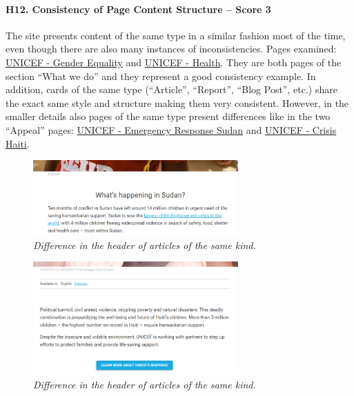 \newpage

\paragraph*{H12. Consistency of Page Content Structure – Score 3}
The site presents content of the same type in a similar fashion most of the time, even though there are also many instances of inconsistencies.
Pages examined: \href{https://www.unicef.org/gender-equality}{UNICEF - Gender Equality} and \href{https://www.unicef.org/health}{UNICEF - Health}. They are both pages of the section “What we do” and they represent a good consistency example. In addition, cards of the same type (“Article”, “Report”, “Blog Post”, etc.) share the exact same style and structure making them very consistent.
However, in the smaller details also pages of the same type present differences like in the two “Appeal” pages: \href{https://www.unicef.org/emergencies/emergency-response-sudan}{UNICEF - Emergency Response Sudan} and \href{https://www.unicef.org/emergencies/crisis-haiti}{UNICEF - Crisis Haiti}.
\begin{figure}[h]
	\centering
	\begin{center}
		\includegraphics[width=0.7\textwidth]{Picture17.png}
	\end{center}
	\captionsetup{font=small}
	\caption{\textit{Difference in the header of articles of the same kind.}}
	\label{fig:label17}
\end{figure}
\begin{figure}[h]
	\centering
	\begin{center}
		\includegraphics[width=0.7\textwidth]{Picture18.png}
	\end{center}
	\captionsetup{font=small}
	\caption{\textit{Difference in the header of articles of the same kind.}}
	\label{fig:label18}
\end{figure}

